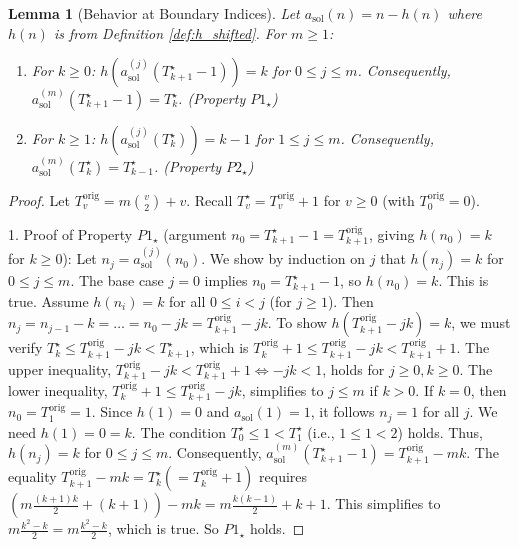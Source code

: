 \documentclass[11pt,a4paper]{article} %
\newtheorem{lemma}[theorem]{Lemma}
\theoremstyle{remark}
\begin{document}
\begin{lemma}[Behavior at Boundary Indices] \label{lem:P_shifted}
Let $a_{\text{sol}}(n) = n-h(n)$ where $h(n)$ is from Definition \ref{def:h_shifted}. For $m \ge 1$:
\begin{enumerate}
    \item For $k \ge 0$: $h(a_{\text{sol}}^{(j)}(T^{\star}_{k+1}-1)) = k$ for $0 \le j \le m$. Consequently, $a_{\text{sol}}^{(m)}(T^{\star}_{k+1}-1) = T^{\star}_k$. (Property $P1_{\star}$)
    \item For $k \ge 1$: $h(a_{\text{sol}}^{(j)}(T^{\star}_k)) = k-1$ for $1 \le j \le m$. Consequently, $a_{\text{sol}}^{(m)}(T^{\star}_k) = T^{\star}_{k-1}$. (Property $P2_{\star}$)
\end{enumerate}
\end{lemma}
\begin{proof}
Let $T_v^{\text{orig}} = m\binom{v}{2}+v$. Recall $T^{\star}_v = T_v^{\text{orig}}+1$ for $v \ge 0$ (with $T_0^{\text{orig}}=0$).

1.  Proof of Property $P1_{\star}$ (argument $n_0 = T^{\star}_{k+1}-1 = T_{k+1}^{\text{orig}}$, giving $h(n_0)=k$ for $k \ge 0$):
    Let $n_j = a_{\text{sol}}^{(j)}(n_0)$. We show by induction on $j$ that $h(n_j)=k$ for $0 \le j \le m$.
    The base case $j=0$ implies $n_0 = T^{\star}_{k+1}-1$, so $h(n_0)=k$. This is true.
    Assume $h(n_i)=k$ for all $0 \le i < j$ (for $j \ge 1$). Then $n_j = n_{j-1}-k = \dots = n_0 - jk = T_{k+1}^{\text{orig}} - jk$.
    To show $h(T_{k+1}^{\text{orig}}-jk)=k$, we must verify $T^{\star}_k \le T_{k+1}^{\text{orig}}-jk < T^{\star}_{k+1}$, which is $T_k^{\text{orig}}+1 \le T_{k+1}^{\text{orig}}-jk < T_{k+1}^{\text{orig}}+1$.
    The upper inequality, $T_{k+1}^{\text{orig}}-jk < T_{k+1}^{\text{orig}}+1 \iff -jk < 1$, holds for $j \ge 0, k \ge 0$.
    The lower inequality, $T_k^{\text{orig}}+1 \le T_{k+1}^{\text{orig}}-jk$, simplifies to $j \le m$ if $k>0$. If $k=0$, then $n_0=T_1^{\text{orig}}=1$. Since $h(1)=0$ and $a_{\text{sol}}(1)=1$, it follows $n_j=1$ for all $j$. We need $h(1)=0=k$. The condition $T_0^{\star} \le 1 < T_1^{\star}$ (i.e., $1 \le 1 < 2$) holds.
    Thus, $h(n_j)=k$ for $0 \le j \le m$.
    Consequently, $a_{\text{sol}}^{(m)}(T^{\star}_{k+1}-1) = T_{k+1}^{\text{orig}} - mk$.
    The equality $T_{k+1}^{\text{orig}} - mk = T^{\star}_k (= T_k^{\text{orig}}+1)$ requires $(m\frac{(k+1)k}{2}+(k+1)) - mk = m\frac{k(k-1)}{2}+k+1$. This simplifies to $m\frac{k^2-k}{2} = m\frac{k^2-k}{2}$, which is true. So $P1_{\star}$ holds.


\end{proof}
\end{document}
